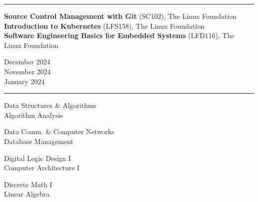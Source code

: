 \documentclass[letter]{article}
\begin{document}
    \vspace{4pt}
    \hrule height 1pt
    \vspace{4pt}
    \noindent
    \begin{minipage}[c]{0.7\linewidth}
        \noindent \textbf{Source Control Management with Git} (SC102), The Linux Foundation \\
        \noindent \textbf{Introduction to Kubernetes} (LFS158), The Linux Foundation \\
        \noindent \textbf{Software Engineering Basics for Embedded Systems} (LFD116), The Linux Foundation \\
    \end{minipage}
    \begin{minipage}[c]{0.29\linewidth}
        \vspace*{-\baselineskip}
        \begin{flushright}
            December 2024 \\
            November 2024 \\
            January 2024 \\
        \end{flushright}
    \end{minipage}

    \vspace{4pt}
    \hrule height 1pt
    \vspace{4pt}
    \noindent
    \begin{minipage}[c]{0.29\linewidth}
        \noindent Data Structures \& Algorithms \\
        \noindent Algorithm Analysis \\
    \end{minipage}
    \begin{minipage}[c]{0.29\linewidth}
        \noindent Data Comm. \& Computer Networks \\
        \noindent Database Management \\
    \end{minipage}
    \begin{minipage}[c]{0.29\linewidth}
        \noindent Digital Logic Design I \\
        \noindent Computer Architecture I \\
    \end{minipage}
        \begin{minipage}[c]{0.29\linewidth}
        \noindent Discrete Math I \\
        \noindent Linear Algebra \\
    \end{minipage}
\end{document}
